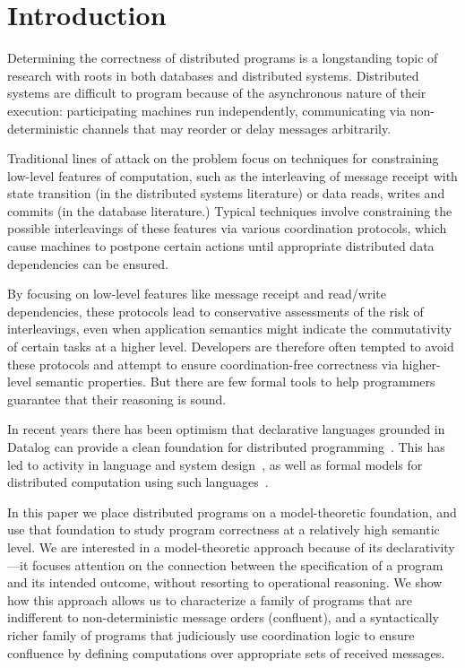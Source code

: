 \section{Introduction}
Determining the correctness of distributed programs is a longstanding topic of research with roots in both databases and distributed systems.  Distributed systems are difficult to program because of the asynchronous nature of their execution: participating machines run independently, communicating via non-deterministic channels that may reorder or delay messages arbitrarily.  

Traditional lines of attack on the problem focus on techniques for constraining low-level features of computation, such as the interleaving of message receipt with state transition (in the distributed systems literature) or data reads, writes and commits (in the database literature.)  Typical techniques involve constraining the possible interleavings of these features via various coordination protocols, which cause machines to postpone certain actions until appropriate distributed data dependencies can be ensured.

By focusing on low-level features like message receipt and read/write dependencies, these protocols lead to conservative assessments of the risk of interleavings, even when application semantics might indicate the commutativity of certain tasks at a higher level. Developers are therefore often tempted to avoid these protocols and attempt to ensure coordination-free correctness via higher-level semantic properties.  But there are few formal tools to help programmers guarantee that their reasoning is sound.

In recent years there has been optimism that declarative languages grounded in Datalog can provide a clean foundation for distributed programming~\cite{declarativeimperative}.  This has led to activity in language and system design~\cite{declarative-distributed-languages}, as well as formal models for distributed computation using such languages~\cite{transducers,what}.  

In this paper we place distributed programs on a model-theoretic foundation, and use that foundation to study program correctness at a relatively high semantic level.  We are interested in a model-theoretic approach because of its declarativity---it focuses attention on the connection between the specification of a program and its intended outcome, without resorting to operational reasoning.  We show how this approach allows us to characterize a family of programs that are indifferent to non-deterministic message orders (confluent), and a syntactically richer family of programs that judiciously use coordination logic to ensure confluence by defining computations over appropriate sets of received messages.

